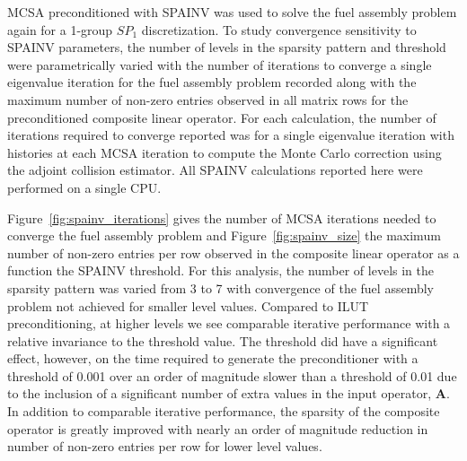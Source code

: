 MCSA preconditioned with SPAINV was used to solve the fuel assembly
problem again for a 1-group $SP_1$ discretization. To study
convergence sensitivity to SPAINV parameters, the number of levels in
the sparsity pattern and threshold were parametrically varied with the
number of iterations to converge a single eigenvalue iteration for the
fuel assembly problem recorded along with the maximum number of
non-zero entries observed in all matrix rows for the preconditioned
composite linear operator. For each calculation, the number of
iterations required to converge reported was for a single eigenvalue
iteration with  histories at each MCSA iteration to compute
the Monte Carlo correction using the adjoint collision estimator. All
SPAINV calculations reported here were performed on a single CPU.

Figure~\ref{fig:spainv_iterations} gives the number of MCSA iterations
needed to converge the fuel assembly problem and
Figure~\ref{fig:spainv_size} the maximum number of non-zero entries
per row observed in the composite linear operator as a function the
SPAINV threshold. For this analysis, the number of levels in the
sparsity pattern was varied from 3 to 7 with convergence of the fuel
assembly problem not achieved for smaller level values. Compared to
ILUT preconditioning, at higher levels we see comparable iterative
performance with a relative invariance to the threshold value. The
threshold did have a significant effect, however, on the time required
to generate the preconditioner with a threshold of 0.001 over an order
of magnitude slower than a threshold of 0.01 due to the inclusion of a
significant number of extra values in the input operator,
$\mathbf{A}$. In addition to comparable iterative performance, the
sparsity of the composite operator is greatly improved with nearly an
order of magnitude reduction in number of non-zero entries per row for
lower level values.

